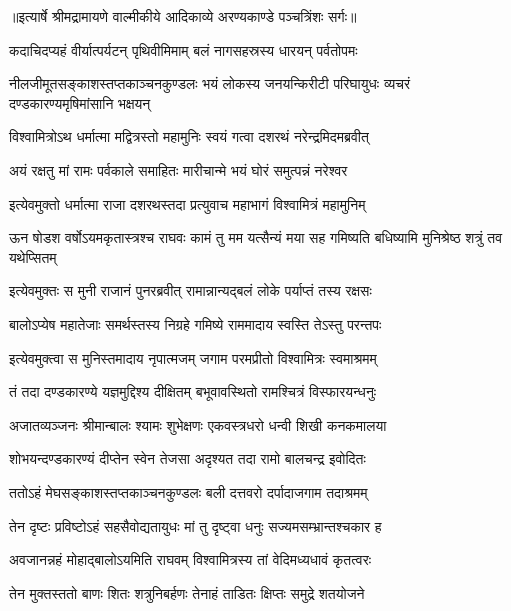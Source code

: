 {॥इत्यार्षे श्रीमद्रामायणे वाल्मीकीये आदिकाव्ये अरण्यकाण्डे पञ्चत्रिंशः सर्गः॥}


\twolineshloka
{कदाचिदप्यहं वीर्यात्पर्यटन् पृथिवीमिमाम्}
{बलं नागसहस्रस्य धारयन् पर्वतोपमः} %

\threelineshloka
{नीलजीमूतसङ्काशस्तप्तकाञ्चनकुण्डलः}
{भयं लोकस्य जनयन्किरीटी परिघायुधः}
{व्यचरं दण्डकारण्यमृषिमांसानि भक्षयन्} %

\twolineshloka
{विश्वामित्रोऽथ धर्मात्मा मद्वित्रस्तो महामुनिः}
{स्वयं गत्वा दशरथं नरेन्द्रमिदमब्रवीत्} %

\twolineshloka
{अयं रक्षतु मां रामः पर्वकाले समाहितः}
{मारीचान्मे भयं घोरं समुत्पन्नं नरेश्वर} %

\twolineshloka
{इत्येवमुक्तो धर्मात्मा राजा दशरथस्तदा}
{प्रत्युवाच महाभागं विश्वामित्रं महामुनिम्} %

\threelineshloka
{ऊन षोडश वर्षोऽयमकृतास्त्रश्च राघवः}
{कामं तु मम यत्सैन्यं मया सह गमिष्यति}
{बधिष्यामि मुनिश्रेष्ठ शत्रुं तव यथेप्सितम्} %

\twolineshloka
{इत्येवमुक्तः स मुनी राजानं पुनरब्रवीत्}
{रामान्नान्यद्बलं लोके पर्याप्तं तस्य रक्षसः} %

\twolineshloka
{बालोऽप्येष महातेजाः समर्थस्तस्य निग्रहे}
{गमिष्ये राममादाय स्वस्ति तेऽस्तु परन्तपः} %

\twolineshloka
{इत्येवमुक्त्वा स मुनिस्तमादाय नृपात्मजम्}
{जगाम परमप्रीतो विश्वामित्रः स्वमाश्रमम्} %

\twolineshloka
{तं तदा दण्डकारण्ये यज्ञमुद्दिश्य दीक्षितम्}
{बभूवावस्थितो रामश्चित्रं विस्फारयन्धनुः} %

\twolineshloka
{अजातव्यञ्जनः श्रीमान्बालः श्यामः शुभेक्षणः}
{एकवस्त्रधरो धन्वी शिखी कनकमालया} %

\twolineshloka
{शोभयन्दण्डकारण्यं दीप्तेन स्वेन तेजसा}
{अदृश्यत तदा रामो बालचन्द्र इवोदितः} %

\twolineshloka
{ततोऽहं मेघसङ्काशस्तप्तकाञ्चनकुण्डलः}
{बली दत्तवरो दर्पादाजगाम तदाश्रमम्} %

\twolineshloka
{तेन दृष्टः प्रविष्टोऽहं सहसैवोद्यतायुधः}
{मां तु दृष्ट्वा धनुः सज्यमसम्भ्रान्तश्चकार ह} %

\twolineshloka
{अवजानन्नहं मोहाद्बालोऽयमिति राघवम्}
{विश्वामित्रस्य तां वेदिमध्यधावं कृतत्वरः} %

\twolineshloka
{तेन मुक्तस्ततो बाणः शितः शत्रुनिबर्हणः}
{तेनाहं ताडितः क्षिप्तः समुद्रे शतयोजने} %

